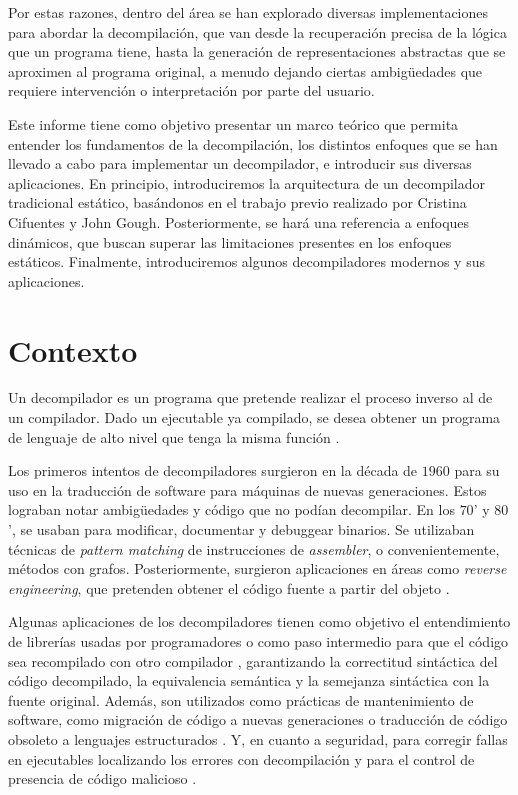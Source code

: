 \documentclass[runningheads]{llncs}
\begin{document}
Por estas razones, dentro del área se han explorado diversas implementaciones para abordar la decompilación, 
que van desde la recuperación precisa de la lógica que un programa tiene, hasta la generación de 
representaciones abstractas que se aproximen al programa original, a menudo dejando ciertas ambigüedades 
que requiere intervención o interpretación por parte del usuario.

Este informe tiene como objetivo presentar un marco teórico que permita entender los fundamentos de la 
decompilación, los distintos enfoques que se han llevado a cabo para implementar un decompilador, e 
introducir sus diversas aplicaciones. En principio, introduciremos la arquitectura de un decompilador 
tradicional estático, basándonos en el trabajo previo realizado por Cristina Cifuentes y John Gough.
Posteriormente, se hará una referencia a enfoques dinámicos, que buscan superar las limitaciones 
presentes en los enfoques estáticos. Finalmente, introduciremos algunos decompiladores modernos 
y sus aplicaciones.

%
\section{Contexto}
Un decompilador es un programa que pretende realizar el proceso inverso al de un compilador. 
Dado un ejecutable ya compilado, se desea obtener un programa de lenguaje de alto nivel que tenga 
la misma función \cite{cifuentes-dcc}.

Los primeros intentos de decompiladores surgieron en la década de $1960$ para su uso en la traducción 
de software para máquinas de nuevas generaciones. Estos lograban notar ambigüedades y código que no 
podían decompilar. En los $70$’ y $80$’, se usaban para modificar, documentar y debuggear binarios. 
Se utilizaban técnicas de \textit{pattern matching} de instrucciones de \textit{assembler}, o 
convenientemente, métodos con grafos. Posteriormente, surgieron aplicaciones en áreas como 
\textit{reverse engineering}, que pretenden obtener el código fuente a partir del objeto \cite{decompilation-methodology}.

Algunas aplicaciones de los decompiladores tienen como objetivo el entendimiento de librerías usadas 
por programadores o como paso intermedio para que el código sea recompilado con otro compilador \cite{meta-decompilation}, 
garantizando la correctitud sintáctica del código decompilado, la equivalencia semántica y la semejanza 
sintáctica con la fuente original. Además, son utilizados como prácticas de mantenimiento de software,
como migración de código a nuevas generaciones o traducción de código obsoleto a lenguajes estructurados \cite{cifuentes-dcc}.
Y, en cuanto a seguridad, para corregir fallas en ejecutables localizando los errores con decompilación \cite{decompilation-correctness}
y para el control de presencia de código malicioso \cite{cifuentes-dcc}.
\end{document}
